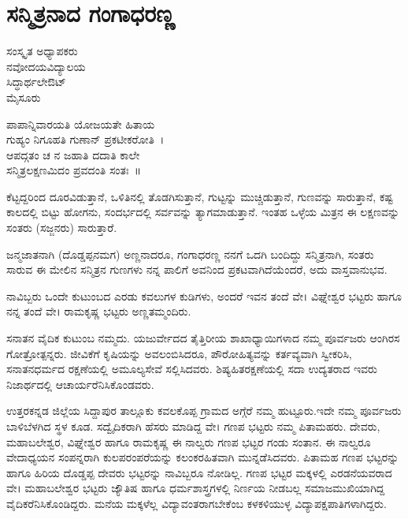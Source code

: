 {\fontsize{14}{16}\selectfont
\chapter{ಸನ್ಮಿತ್ರನಾದ ಗಂಗಾಧರಣ್ಣ}

\begin{center}
\smallskip
ಸಂಸ್ಕೃತ ಅಧ್ಯಾಪಕರು \\
ನವೋದಯವಿದ್ಯಾಲಯ\\
ಸಿದ್ಧಾರ್ಥಲೇಔಟ್ \\ 
ಮೈಸೂರು
\addrule
\end{center}

\begin{center}
ಪಾಪಾನ್ನಿವಾರಯತಿ ಯೋಜಯತೇ ಹಿತಾಯ\\
ಗುಹ್ಯಂ ನಿಗೂಹತಿ ಗುಣಾನ್ ಪ್ರಕಟೀಕರೋತಿ~।\\
ಆಪದ್ಗತಂ ಚ ನ ಜಹಾತಿ ದದಾತಿ ಕಾಲೇ\\
ಸನ್ಮಿತ್ರಲಕ್ಷಣಮಿದಂ ಪ್ರವದಂತಿ ಸಂತಃ~॥
\end{center}
ಕೆಟ್ಟದ್ದರಿಂದ ದೂರವಿಡುತ್ತಾನೆ, ಒಳಿತಿನಲ್ಲಿ ತೊಡಗಿಸುತ್ತಾನೆ, ಗುಟ್ಟನ್ನು  ಮುಚ್ಚಿಡುತ್ತಾನೆ, ಗುಣವನ್ನು ಸಾರುತ್ತಾನೆ, ಕಷ್ಟ ಕಾಲದಲ್ಲಿ ಬಿಟ್ಟು ಹೋಗನು, ಸಂದರ್ಭ\-ದಲ್ಲಿ ಸರ್ವವನ್ನು ತ್ಯಾಗಮಾಡುತ್ತಾನೆ. ಇಂತಹ ಒಳ್ಳೆಯ ಮಿತ್ರನ ಈ ಲಕ್ಷಣವನ್ನು ಸಂತರು (ಸಜ್ಜನರು) ಸಾರುತ್ತಾರೆ. 

ಜನ್ಮಜಾತನಾಗಿ (ದೊಡ್ಡಪ್ಪನಮಗ) ಅಣ್ಣನಾದರೂ, ಗಂಗಾಧರಣ್ಣ ನನಗೆ ಒದಗಿ ಬಂದಿದ್ದು ಸನ್ಮಿತ್ರನಾಗಿ, ಸಂತರು ಸಾರುವ ಈ ಮೇಲಿನ ಸನ್ಮಿತ್ರನ ಗುಣಗಳು ನನ್ನ ಪಾಲಿಗೆ ಅವನಿಂದ ಪ್ರಕಟವಾಗಿದೆಯೆಂದರೆ, ಅದು ವಾಸ್ತವಾನುಭವ.

ನಾವಿಬ್ಬರು ಒಂದೇ ಕುಟುಂಬದ ಎರಡು ಕವಲುಗಳ ಕುಡಿಗಳು, ಅಂದರೆ ಇವನ ತಂದೆ ವೇ। ವಿಘ್ನೇಶ್ವರ ಭಟ್ಟರು ಹಾಗೂ ನನ್ನ ತಂದೆ ವೇ। ರಾಮಕೃಷ್ಣ ಭಟ್ಟರು ಅಣ್ಣ\-ತಮ್ಮಂದಿರು.

ಸನಾತನ ವೈದಿಕ ಕುಟುಂಬ ನಮ್ಮದು. ಯಜುರ್ವೇದದ  ತೈತ್ತಿರೀಯ ಶಾಖಾಧ್ಯಾಯಿಗಳಾದ ನಮ್ಮ  ಪೂರ್ವಜರು ಆಂಗಿರಸ ಗೋತ್ರೋತ್ಪನ್ನರು. ಜೀವಿಕೆಗೆ ಕೃಷಿಯನ್ನು ಅವಲಂಬಿಸಿದರೂ, ಪೌರೋಹಿತ್ಯವನ್ನು ಕರ್ತವ್ಯವಾಗಿ ಸ್ವೀಕರಿಸಿ, ಸನಾತನಧರ್ಮದ ರಕ್ಷಣೆಯಲ್ಲಿ ಅಮೂಲ್ಯಸೇವೆ ಸಲ್ಲಿಸಿದವರು. ಶಿಷ್ಯಹಿತರಕ್ಷಣೆಯಲ್ಲಿ  ಸದಾ ಉದ್ಯತರಾದ ಇವರು ನಿಜಾರ್ಥದಲ್ಲಿ ಆಚಾರ್ಯರೆನಿಸಿಕೊಂಡವರು. 

ಉತ್ತರಕನ್ನಡ ಜಿಲ್ಲೆಯ ಸಿದ್ದಾಪುರ ತಾಲ್ಲೂಕು ಕವಲಕೊಪ್ಪ ಗ್ರಾಮದ ಅಗ್ಗೆರೆ ನಮ್ಮ ಹುಟ್ಟೂರು.ಇದೇ ನಮ್ಮ ಪೂರ್ವಜರು ಬಾಳಿಬೆಳಗಿದ ಸ್ಥಳ ಕೂಡ. ಸದ್ವೈದಿಕರಾಗಿ ಹೆಸರು ಮಾಡಿದ್ದ ವೇ। ಗಣಪ ಭಟ್ಟರು ನಮ್ಮ  ಪಿತಾಮಹರು. ದೇವರು, ಮಹಾಬಲೇಶ್ವರ, ವಿಘ್ನೇಶ್ವರ ಹಾಗೂ ರಾಮಕೃಷ್ಣ ಈ ನಾಲ್ವರು ಗಣಪ ಭಟ್ಟರ ಗಂಡು ಸಂತಾನ. ಈ ನಾಲ್ವರೂ ವೇದಾಧ್ಯಯನ ಸಂಪನ್ನರಾಗಿ ಕುಲಪರಂಪರೆಯನ್ನು ಕಲಂಕರಹಿತವಾಗಿ ಮುನ್ನಡೆಸಿದವರು. ಪಿತಾಮಹ ಗಣಪ ಭಟ್ಟರನ್ನು ಹಾಗೂ ಹಿರಿಯ ದೊಡ್ಡಪ್ಪ ದೇವರು ಭಟ್ಟರನ್ನು ನಾವಿಬ್ಬರೂ ನೋಡಿಲ್ಲ. ಗಣಪ ಭಟ್ಟರ ಮಕ್ಕಳಲ್ಲಿ ಎರಡನೆಯವರಾದ ವೇ। ಮಹಾಬಲೇಶ್ವರ ಭಟ್ಟರು ಜ್ಯೌತಿಷ ಹಾಗೂ ಧರ್ಮಶಾಸ್ತ್ರಗಳಲ್ಲಿ ನಿರ್ಣಯ ನೀಡಬಲ್ಲ ಸಮಾಜಮುಖಿಯಾಗಿದ್ದ ವೈದಿಕರೆನಿಸಿಕೊಂಡಿದ್ದರು. ಮನೆಯ ಮಕ್ಕಳೆಲ್ಲ ವಿದ್ಯಾವಂತರಾಗಬೇಕೆಂಬ ಕಳಕಳಿಯುಳ್ಳ ವಿದ್ಯಾಪಕ್ಷಪಾತಿಗಳಾಗಿದ್ದರು.

}
